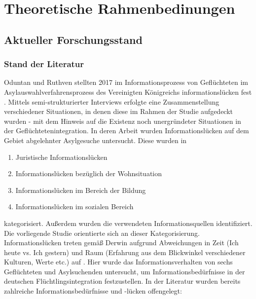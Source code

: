 \section{Theoretische Rahmenbedinungen}

\subsection{Aktueller Forschungsstand}


\subsubsection{Stand der Literatur}

Oduntan und Ruthven stellten 2017 im Informationsprozess von Gefl\"uchteten im Asylauswahlverfahrensprozess des Vereinigten K\"onigreichs informationsl\"ucken fest \citep{oduntan2017investigating}.\newline
Mittels semi-strukturierter Interviews erfolgte eine Zusammenstellung verschiedener Situationen, in denen diese im Rahmen der Studie aufgedeckt wurden - mit dem Hinweis auf die Existenz noch unergr\"undeter Situationen in der Gefl\"uchtetenintegration.\newline
In deren Arbeit wurden Informationslücken auf dem Gebiet abgelehnter Asylgesuche untersucht. Diese wurden in 
\begin{enumerate}
    \item Juristische Informationslücken
    \item Informationslücken bezüglich der Wohnsituation
    \item Informationslücken im Bereich der Bildung
    \item Informationslücken im sozialen Bereich
\end{enumerate}
kategorisiert. Außerdem wurden die verwendeten Informationsquellen identifiziert. Die vorliegende Studie orientierte sich an dieser Kategorisierung.\newline
Informationsl\"ucken treten gem\"a\ss{} Derwin aufgrund Abweichungen in Zeit (Ich heute vs. Ich gestern) und Raum (Erfahrung aus dem Blickwinkel verschiedener Kulturen, Werte etc.) auf \citep{dervin2003sense}.\newline
Hier wurde das Informationsverhalten von sechs Gefl\"uchteten und Asylsuchenden untersucht, um Informationsbed\"urfnisse in der deutschen Fl\"uchtlingsintegration festzustellen.\newline
In der Literatur wurden bereits zahlreiche Informationsbedürfnisse und -lücken offengelegt:\newline

